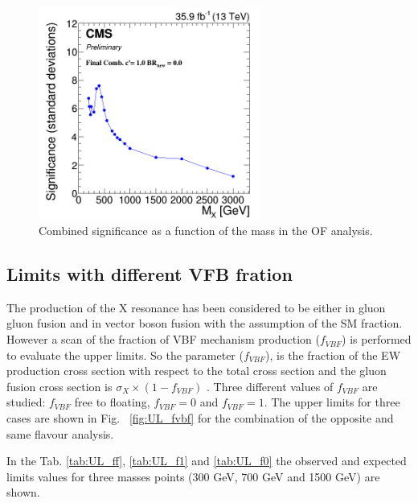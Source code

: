 \begin{figure}[htb]
\centering
\includegraphics[width=0.65\textwidth]{Figs/Final_comb/c1_sig_OS_comb.png}
\caption{Combined significance as a function of the mass in the OF analysis.}
    \label{fig:sig_OFSF_comb}
\end{figure}

\newpage


\subsection{Limits with different VFB fration}
The production of the X resonance has been considered to be either in gluon gluon fusion and in vector boson fusion with the assumption of the SM fraction. 
However a scan of the fraction of VBF mechanism production ($f_{VBF}$) is performed  to evaluate the  upper limits. So the parameter ($f_{VBF}$), is the fraction of the EW production cross section with respect to the total cross section and the gluon fusion cross section is $\sigma_X \times ( 1 − f_{VBF} )$ .
Three different values of $f_{VBF}$ are studied: $f_{VBF}$ free to floating, $f_{VBF}=0$ and $f_{VBF}=1$. The upper limits for three cases are shown 
in Fig. ~\ref{fig:UL_fvbf} for the combination of the opposite and same flavour analysis.

In the Tab. \ref{tab:UL_ff},  \ref{tab:UL_f1} and \ref{tab:UL_f0} the observed and expected limits values for three masses points (300 GeV, 700 GeV and 1500 GeV) are shown.




